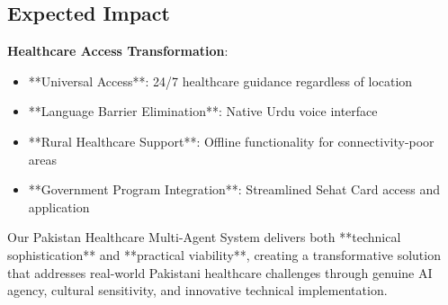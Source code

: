 \documentclass[11pt,a4paper]{article}
\begin{document}
\subsection{Expected Impact}

\textbf{Healthcare Access Transformation}:
\begin{itemize}[leftmargin=*, itemsep=0pt]
    \item **Universal Access**: 24/7 healthcare guidance regardless of location
    \item **Language Barrier Elimination**: Native Urdu voice interface
    \item **Rural Healthcare Support**: Offline functionality for connectivity-poor areas
    \item **Government Program Integration**: Streamlined Sehat Card access and application
\end{itemize}

Our Pakistan Healthcare Multi-Agent System delivers both **technical sophistication** and **practical viability**, creating a transformative solution that addresses real-world Pakistani healthcare challenges through genuine AI agency, cultural sensitivity, and innovative technical implementation.
\end{document}
